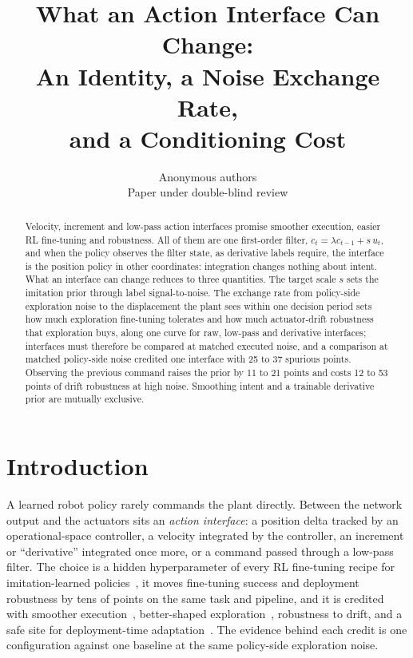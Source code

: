 \documentclass{article}
\title{What an Action Interface Can Change:\\ An Identity, a Noise Exchange Rate,\\ and a Conditioning Cost}
\author{Anonymous authors\\ Paper under double-blind review}
\begin{document}
\maketitle

\begin{abstract}
Velocity, increment and low-pass action interfaces promise smoother execution, easier RL fine-tuning and robustness. All of them are one first-order filter, $c_t=\lambda c_{t-1}+s\,u_t$, and when the policy observes the filter state, as derivative labels require, the interface is the position policy in other coordinates: integration changes nothing about intent. What an interface can change reduces to three quantities. The target scale $s$ sets the imitation prior through label signal-to-noise. The exchange rate from policy-side exploration noise to the displacement the plant sees within one decision period sets how much exploration fine-tuning tolerates and how much actuator-drift robustness that exploration buys, along one curve for raw, low-pass and derivative interfaces; interfaces must therefore be compared at matched executed noise, and a comparison at matched policy-side noise credited one interface with 25 to 37 spurious points. Observing the previous command raises the prior by 11 to 21 points and costs 12 to 53 points of drift robustness at high noise. Smoothing intent and a trainable derivative prior are mutually exclusive.
\end{abstract}

\section{Introduction}

A learned robot policy rarely commands the plant directly. Between the network output and the actuators sits an \emph{action interface}: a position delta tracked by an operational-space controller, a velocity integrated by the controller, an increment or ``derivative'' integrated once more, or a command passed through a low-pass filter. The choice is a hidden hyperparameter of every RL fine-tuning recipe for imitation-learned policies~\citep{ren2024diffusionpolicypolicyoptimization,li2026reinforcementlearningactionchunking}, it moves fine-tuning success and deployment robustness by tens of points on the same task and pipeline, and it is credited with smoother execution~\citep{mysore2021caps,raffin2021smoothexplorationroboticreinforcement}, better-shaped exploration~\citep{eberhard2023pink,korenkevych2019autoregressive}, robustness to drift, and a safe site for deployment-time adaptation~\citep{muttaqien2026orpaonlineresidualpolicy,wagenmaker2025steeringdiffusionpolicylatent}. The evidence behind each credit is one configuration against one baseline at the same policy-side exploration noise.
\end{document}
